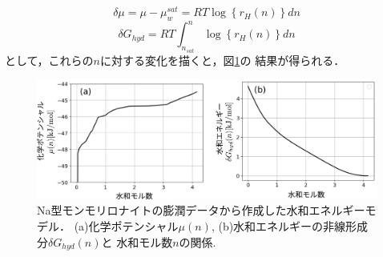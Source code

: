 \begin{equation}
	\delta \mu = \mu-\mu_{w}^{sat}
	=
	RT \log \left\{ r_H(n)\right\} dn
\end{equation}
\begin{equation}
	\delta G_{hyd} =
	RT
	\int_{n_{sat}}^{n} \log \left\{ r_H(n)\right\} dn
\end{equation}
として，これらの\(n\)に対する変化を描くと，図\ref{fig:fig2}の
結果が得られる．
\begin{figure}[h]
	\begin{center}
	\includegraphics[width=1.0\linewidth]{Figs/fig2.pdf} 
	\end{center}
	\caption{
		Na型モンモリロナイトの膨潤データから作成した水和エネルギーモデル．
		(a)化学ポテンシャル$\mu(n)$, (b)水和エネルギーの非線形成分$\delta G_{hyd}(n)$と
		水和モル数$n$の関係.
	} 
	\label{fig:fig2}
\end{figure}
